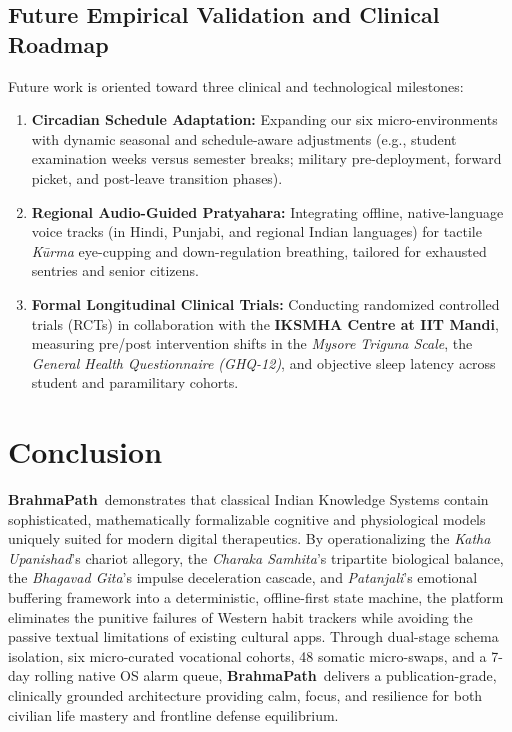 \documentclass[11pt,a4paper]{article}
\newcommand{\AppName}{\textbf{BrahmaPath}}
\begin{document}
\subsection{Future Empirical Validation and Clinical Roadmap}
Future work is oriented toward three clinical and technological milestones:
\begin{enumerate}[leftmargin=*]
    \item \textbf{Circadian Schedule Adaptation:} Expanding our six micro-environments with dynamic seasonal and schedule-aware adjustments (e.g., student examination weeks versus semester breaks; military pre-deployment, forward picket, and post-leave transition phases).
    \item \textbf{Regional Audio-Guided Pratyahara:} Integrating offline, native-language voice tracks (in Hindi, Punjabi, and regional Indian languages) for tactile \textit{K\=urma} eye-cupping and down-regulation breathing, tailored for exhausted sentries and senior citizens.
    \item \textbf{Formal Longitudinal Clinical Trials:} Conducting randomized controlled trials (RCTs) in collaboration with the \textbf{IKSMHA Centre at IIT Mandi}, measuring pre/post intervention shifts in the \textit{Mysore Triguna Scale}, the \textit{General Health Questionnaire (GHQ-12)}, and objective sleep latency across student and paramilitary cohorts.
\end{enumerate}

\section{Conclusion}
\AppName\ demonstrates that classical Indian Knowledge Systems contain sophisticated, mathematically formalizable cognitive and physiological models uniquely suited for modern digital therapeutics. By operationalizing the \textit{Katha Upanishad}'s chariot allegory, the \textit{Charaka Samhita}'s tripartite biological balance, the \textit{Bhagavad Gita}'s impulse deceleration cascade, and \textit{Patanjali}'s emotional buffering framework into a deterministic, offline-first state machine, the platform eliminates the punitive failures of Western habit trackers while avoiding the passive textual limitations of existing cultural apps. Through dual-stage schema isolation, six micro-curated vocational cohorts, 48 somatic micro-swaps, and a 7-day rolling native OS alarm queue, \AppName\ delivers a publication-grade, clinically grounded architecture providing calm, focus, and resilience for both civilian life mastery and frontline defense equilibrium.
\end{document}
